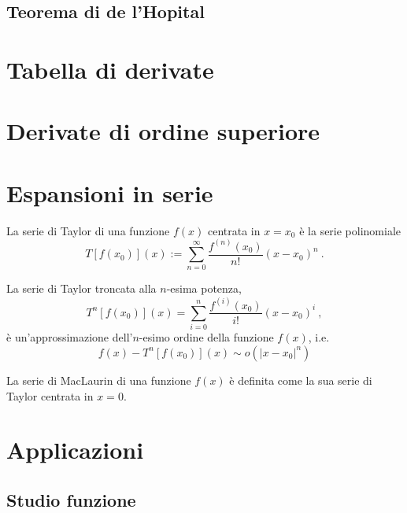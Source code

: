 \subsection{Teorema di de l'Hopital}
\begin{theorem}
\end{theorem}

\section{Tabella di derivate}

\section{Derivate di ordine superiore}

\section{Espansioni in serie}
\begin{definition} La serie di Taylor di una funzione $f(x)$ centrata in $x=x_0$ è la serie polinomiale
\begin{equation}
   T[f(x_0)](x) := \sum_{n=0}^{\infty} \dfrac{f^{(n)}(x_0)}{n!} (x-x_0)^n \ .
\end{equation}
\end{definition}
%
\begin{theorem}
La serie di Taylor troncata alla $n$-esima potenza,
\begin{equation}
  T^n[f(x_0)](x) = \sum_{i=0}^{n} \dfrac{f^{(i)}(x_0)}{i!} (x-x_0)^i \ ,
\end{equation}
è un'approssimazione dell'$n$-esimo ordine della funzione $f(x)$, i.e.
\begin{equation}
  f(x) - T^n[f(x_0)](x) \sim o(|x-x_0|^{n})
\end{equation}
\end{theorem}

\begin{definition} La serie di MacLaurin di una funzione $f(x)$ è definita come la sua serie di Taylor centrata in $x=0$.
\end{definition}


\section{Applicazioni}
\subsection{Studio funzione}


